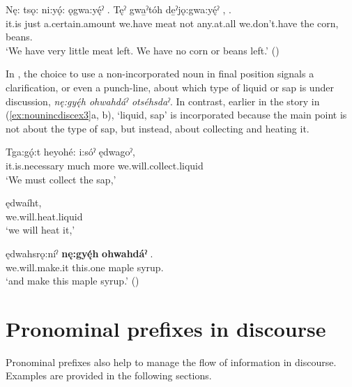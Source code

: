 \ea\label{ex:nounincdiscex5}
 \gll Nę: tsǫ: ni:yǫ́: ǫgwa:yę́ˀ . Tęˀ gwa̱ˀtóh de̱ˀjǫ:gwa:yę́ˀ  , .\\
it.is just a.certain.amount we.have meat not any.at.all we.don’t.have the corn, beans.\\
\glt ‘We have very little meat left. We have no corn or beans left.’ (\cite{carrier_legends_2013})
\z

In , the choice to use a non-incorporated noun in final position signals a clarification, or even a punch-line, about which type of liquid or sap is under discussion, \textit{nę:gyę́h ohwahdáˀ otséhsdaˀ}. In contrast, earlier in the story in (\ref{ex:nounincdiscex3}a, b),  ‘liquid, sap’ is incorporated because the main point is not about the type of sap, but instead, about collecting and heating it.

\ea\label{ex:nounincdiscex3}
\ea\label{ex:nounincdiscex3a} 
 \gll Tga:gǫ́:t heyohé: i:sóˀ ędwagoˀ,\\
it.is.necessary much more  we.will.collect.liquid\\
\glt ‘We must collect the sap,’

\ex \label{ex:nounincdiscex3b}
 \gll ędwaíht, \\
we.will.heat.liquid\\
\glt ‘we will heat it,’

\ex \label{ex:nounincdiscex3c}
 \gll ędwahsrǫ:níˀ \textbf{nę:gyę́h} \textbf{ohwahdáˀ} .\\
we.will.make.it this.one maple syrup.\\
\glt ‘and make this maple syrup.’ (\cite{carrier_legends_2013})
\z
\z 


\chapter{Pronominal prefixes in discourse} \label{ch:Pronominal prefixes in discourse}
Pronominal prefixes also help to manage the flow of information in discourse. Examples are provided in the following sections.


